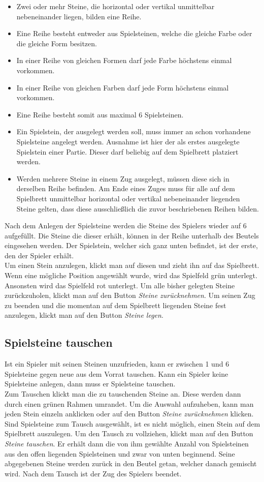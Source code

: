 \documentclass[a4paper, ngerman]{scrartcl}
\begin{document}
\begin{itemize}
\item Zwei oder mehr Steine, die horizontal oder vertikal unmittelbar nebeneinander liegen, bilden eine Reihe.
\item Eine Reihe besteht entweder aus Spielsteinen, welche die gleiche Farbe oder die gleiche Form besitzen.
\item In einer Reihe von gleichen Formen darf jede Farbe höchstens einmal vorkommen.
\item In einer Reihe von gleichen Farben darf jede Form höchstens einmal vorkommen.
\item Eine Reihe besteht somit aus maximal 6 Spielsteinen.
\item Ein Spielstein, der ausgelegt werden soll, muss immer an schon vorhandene Spielsteine angelegt werden. Ausnahme ist hier der als erstes ausgelegte Spielstein einer Partie. Dieser darf beliebig auf dem Spielbrett platziert werden.
\item Werden mehrere Steine in einem Zug ausgelegt, müssen diese sich in derselben Reihe befinden. Am Ende eines Zuges muss für alle auf dem Spielbrett unmittelbar horizontal oder vertikal nebeneinander liegenden Steine gelten, dass diese ausschließlich die zuvor beschriebenen Reihen bilden.
\end{itemize}

Nach dem Anlegen der Spielsteine werden die Steine des Spielers wieder auf 6 aufgefüllt. Die Steine die dieser erhält, können in der Reihe unterhalb des Beutels eingesehen werden. Der Spielstein, welcher sich ganz unten befindet, ist der erste, den der Spieler erhält.\\
Um einen Stein anzulegen, klickt man auf diesen und zieht ihn auf das Spielbrett. Wenn eine mögliche Position angewählt wurde, wird das Spielfeld grün unterlegt. Ansonsten wird das Spielfeld rot unterlegt. Um alle bisher gelegten Steine zurückzuholen, klickt man auf den Button \emph{Steine zurücknehmen}. Um seinen Zug zu beenden und die momentan auf dem Spielbrett liegenden Steine fest anzulegen, klickt man auf den Button \emph{Steine legen}.
	 
\subsection{Spielsteine tauschen}
Ist ein Spieler mit seinen Steinen unzufrieden, kann er zwischen 1 und 6 Spielsteine gegen neue aus dem Vorrat tauschen. Kann ein Spieler keine Spielsteine anlegen, dann muss er Spielsteine tauschen.\\
Zum Tauschen klickt man die zu tauschenden Steine an. Diese werden dann durch einen grünen Rahmen umrandet. Um die Auswahl aufzuheben, kann man jeden Stein einzeln anklicken oder auf den Button \emph{Steine zurücknehmen} klicken. Sind Spielsteine zum Tausch ausgewählt, ist es nicht möglich, einen Stein auf dem Spielbrett auszulegen. Um den Tausch zu vollziehen, klickt man auf den Button \emph{Steine tauschen}.
 Er erhält dann die von ihm gewählte Anzahl von Spielsteinen aus den offen liegenden Spielsteinen und zwar von unten beginnend. Seine abgegebenen Steine werden zurück in den Beutel getan, welcher danach gemischt wird.
 Nach dem Tausch ist der Zug des Spielers beendet.
	
\end{document}
